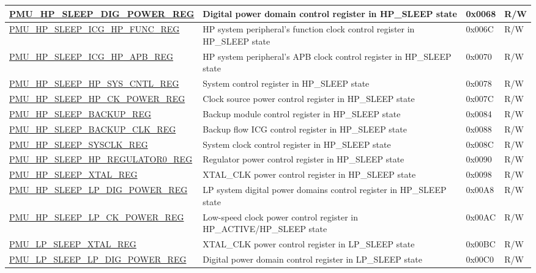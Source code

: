 \begin{longtable}{ | l | L{6cm} | L{1.3cm} | L{1.5cm} | }
\hyperref[regdesc:PMUHPSLEEPDIGPOWERREG]{PMU\_HP\_SLEEP\_DIG\_POWER\_REG} & Digital power domain control register in HP\_SLEEP state & 0x0068 & R/W \\ \hline
\hyperref[regdesc:PMUHPSLEEPICGHPFUNCREG]{PMU\_HP\_SLEEP\_ICG\_HP\_FUNC\_REG} & HP system peripheral's function clock control register in HP\_SLEEP state & 0x006C & R/W \\ \hline
\hyperref[regdesc:PMUHPSLEEPICGHPAPBREG]{PMU\_HP\_SLEEP\_ICG\_HP\_APB\_REG} & HP system peripheral's APB clock control register in HP\_SLEEP state & 0x0070 & R/W \\ \hline
\hyperref[regdesc:PMUHPSLEEPHPSYSCNTLREG]{PMU\_HP\_SLEEP\_HP\_SYS\_CNTL\_REG} & System control register in HP\_SLEEP state & 0x0078 & R/W \\ \hline
\hyperref[regdesc:PMUHPSLEEPHPCKPOWERREG]{PMU\_HP\_SLEEP\_HP\_CK\_POWER\_REG} &  Clock source power control register in HP\_SLEEP state & 0x007C & R/W \\ \hline
\hyperref[regdesc:PMUHPSLEEPBACKUPREG]{PMU\_HP\_SLEEP\_BACKUP\_REG} & Backup module control register in HP\_SLEEP state & 0x0084 & R/W \\ \hline
\hyperref[regdesc:PMUHPSLEEPBACKUPCLKREG]{PMU\_HP\_SLEEP\_BACKUP\_CLK\_REG} & Backup flow ICG control register in HP\_SLEEP state & 0x0088 & R/W \\ \hline
\hyperref[regdesc:PMUHPSLEEPSYSCLKREG]{PMU\_HP\_SLEEP\_SYSCLK\_REG} & System clock control register in HP\_SLEEP state & 0x008C & R/W \\ \hline
\hyperref[regdesc:PMUHPSLEEPHPREGULATOR0REG]{PMU\_HP\_SLEEP\_HP\_REGULATOR0\_REG} & Regulator power control register in HP\_SLEEP state & 0x0090 & R/W \\ \hline
\hyperref[regdesc:PMUHPSLEEPXTALREG]{PMU\_HP\_SLEEP\_XTAL\_REG} & XTAL\_CLK power control register in HP\_SLEEP state & 0x0098 & R/W \\ \hline
\hyperref[regdesc:PMUHPSLEEPLPDIGPOWERREG]{PMU\_HP\_SLEEP\_LP\_DIG\_POWER\_REG} & LP system digital power domains control register in HP\_SLEEP state & 0x00A8 & R/W \\ \hline
\hyperref[regdesc:PMUHPSLEEPLPCKPOWERREG]{PMU\_HP\_SLEEP\_LP\_CK\_POWER\_REG} & Low-speed clock power control register in HP\_ACTIVE/HP\_SLEEP state & 0x00AC & R/W \\ \hline
\hyperref[regdesc:PMULPSLEEPXTALREG]{PMU\_LP\_SLEEP\_XTAL\_REG} & XTAL\_CLK power control register in LP\_SLEEP state & 0x00BC & R/W \\ \hline
\hyperref[regdesc:PMULPSLEEPLPDIGPOWERREG]{PMU\_LP\_SLEEP\_LP\_DIG\_POWER\_REG} & Digital power domain control register in LP\_SLEEP state & 0x00C0 & R/W \\ \hline

\end{longtable}
